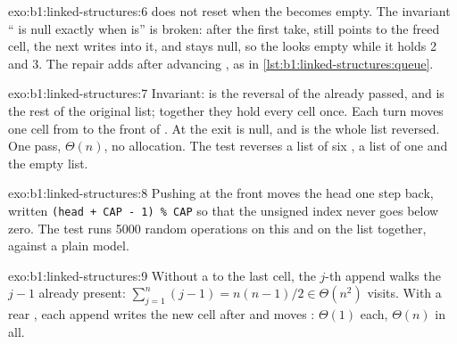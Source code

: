 \begin{solution}{exo:b1:linked-structures:6}
 does not reset  when the  becomes empty. The invariant `` is null exactly when
 is'' is broken: after the first take,  still points to the freed cell, the next  writes
into it, and  stays null, so the  looks empty while it holds 2 and 3. The repair adds
 after advancing , as in \cref{lst:b1:linked-structures:queue}.
\end{solution}

\begin{solution}{exo:b1:linked-structures:7}
Invariant:  is the reversal of the  already passed, and  is the rest of the original list;
together they hold every cell once. Each turn moves one cell from  to the front of . At the exit
 is null, and  is the whole list reversed. One pass, $\Theta(n)$, no allocation. The test reverses
a list of six , a list of one and the empty list.
\end{solution}

\begin{solution}{exo:b1:linked-structures:8}
Pushing at the front moves the head one step back, written \texttt{(head + CAP - 1) \% CAP} so that the unsigned index
never goes below zero. The test runs 5000 random operations on this  and on the  list together, against a
plain  model.
\end{solution}

\begin{solution}{exo:b1:linked-structures:9}
Without a  to the last cell, the $j$-th append walks the $j - 1$  already present: $\sum_{j=1}^{n} (j - 1) =
n(n - 1)/2 \in \Theta(n^2)$ visits. With a rear , each append writes the new cell after  and moves
: $\Theta(1)$ each, $\Theta(n)$ in all.
\end{solution}

